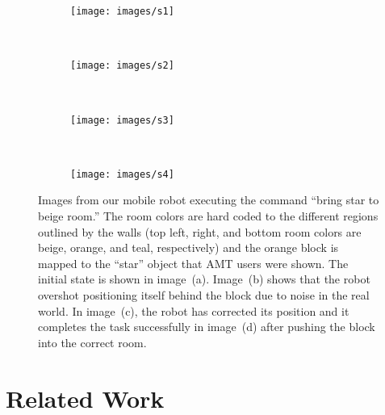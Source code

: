 \documentclass[conference]{IEEEtran}
\begin{document}
\begin{figure}
        \centering
        \begin{subfigure}[b]{0.23\textwidth}
                \texttt{[image: images/s1]}
                \caption{}
                \label{fig:real1}
        \end{subfigure}%
        ~ %
        \begin{subfigure}[b]{0.23\textwidth}
                \texttt{[image: images/s2]}
                \caption{}
                \label{fig:real2}
        \end{subfigure}
        ~ %
        \begin{subfigure}[b]{0.23\textwidth}
                \texttt{[image: images/s3]}
                \caption{}
                \label{fig:real3}
        \end{subfigure}
        ~
         \begin{subfigure}[b]{0.23\textwidth}
                \texttt{[image: images/s4]}
                \caption{}
                \label{fig:real4}
        \end{subfigure}
        \caption{\small Images from our mobile robot executing the command ``bring star to beige room.'' The room colors are hard coded to the different regions outlined by the walls (top left, right, and bottom room colors are beige, orange, and teal, respectively) and the orange block is mapped to the ``star'' object that AMT users were shown. The initial state is shown in image~(a). Image~(b) shows that the robot overshot positioning itself behind the block due to noise in the real world. In image~(c), the robot has corrected its position and it completes the task successfully in image~(d) after pushing the block into the correct room.} \label{fig:real}
\end{figure}

\section{Related Work}
\label{s:rel_work}

\end{document}

